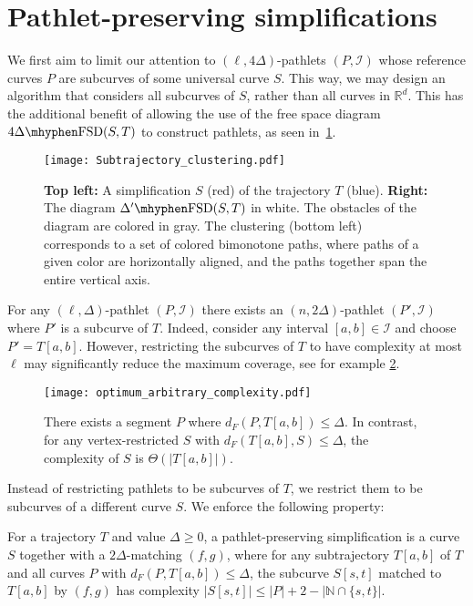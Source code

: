 \documentclass[a4paper,UKenglish,cleveref,thm-restate,notab]{lipics-v2021}
\newcommand{\dF}{\ensuremath{d_F}}
\newcommand{\FSD}[1][\Delta'] {\ensuremath{#1}\mhyphen\mathrm{FSD}}
\newcommand{\R}{\mathbb{R}}
\newcommand{\N}{\mathbb{N}}
\newcommand{\I}{\mathcal{I}}
\begin{document}
\section{Pathlet-preserving simplifications}
\label{sec:simplification}

    We first aim to limit our attention to $(\ell, 4\Delta)$-pathlets $(P, \I)$ whose reference curves $P$ are subcurves of some universal curve $S$.
    This way, we may design an algorithm that considers all subcurves of $S$, rather than all curves in $\R^d$.
    This has the additional benefit of allowing the use of the free space diagram $\FSD[4\Delta](S, T)$ to construct pathlets, as seen in~\cref{fig:pathlets_in_free_space}.

    \begin{figure}
        \centering
        \texttt{[image: Subtrajectory\_clustering.pdf]}
        \caption{ \textbf{Top left:} A simplification $S$ (red) of the trajectory $T$ (blue).
        \textbf{Right:} The diagram $\FSD(S, T)$ in white.
        The obstacles of the diagram are colored in gray.
        The clustering (bottom left)  corresponds to a set of colored bimonotone paths, where paths of a given color are horizontally aligned, and the paths together span the entire vertical axis.}
        \label{fig:pathlets_in_free_space}
    \end{figure}
    
    For any $(\ell, \Delta)$-pathlet $(P, \I)$ there exists an $(n, 2 \Delta)$-pathlet $(P', \I)$ where $P'$ is a subcurve of $T$. Indeed, consider any interval $[a, b] \in \I$ and choose $P' = T[a, b]$. However, restricting the subcurves of $T$ to have complexity at most $\ell$ may significantly reduce the maximum coverage, see for example \cref{fig:optimum_arbitrary_complexity}.
\begin{figure}[b]
        \centering
        \texttt{[image: optimum\_arbitrary\_complexity.pdf]}
        \caption{There exists a segment $P$ where $\dF(P, T[a, b]) \leq \Delta$. 
        In contrast, for any vertex-restricted $S$ with $\dF(T[a, b], S) \leq \Delta$, the complexity of $S$ is $\Theta(|T[a, b]|)$.}
        \label{fig:optimum_arbitrary_complexity}
    \end{figure}
Instead of restricting pathlets to be subcurves of $T$, we restrict them to be subcurves of a different curve $S$. We enforce the following property: 
        
    \begin{definition}
    \label{def:simplification}
        For a trajectory $T$ and value $\Delta \geq 0$, a pathlet-preserving simplification is a curve $S$ together with a $2\Delta$-matching $(f, g)$, where for any subtrajectory $T[a, b]$ of $T$ and all curves $P$ with $\dF(P, T[a, b]) \leq \Delta$, the subcurve $S[s, t]$ matched to $T[a, b]$ by $(f, g)$ has complexity $|S[s, t]| \leq |P| + 2 - |\N \cap \{s, t\}|$.
    \end{definition}
\end{document}
